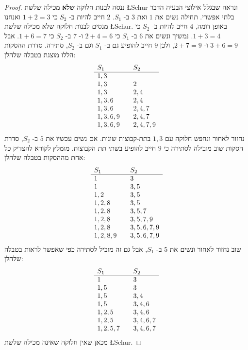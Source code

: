 \begin{proof}
ננסה לבנות חלוקה 
\textbf{שלא}
מכילה שלשת
\L{Schur}
ונראה שבגלל אילוצי הבעיה הדבר בלתי אפשרי. תחילה נשים את
$1$
ואת
$3$
ב-%
$S_1$.
$2$
חייב להיות ב-%
$S_2$
כי
$1+2=3$
ואנחנו מנסים לבנות חלוקה שלא מכילה שלשת
\L{Schur}.
באופן דומה, 
$4$
חייב להיות ב-%
$S_2$
כי
$1+3=4$.
נמשיך ונשים את
$6$
ב-%
$S_1$
כי
$2+4=6$
ו-%
$7$
ב-%
$S_2$
כי
$1+6=7$.
אבל
$3+6=9$
ו-%
$2+7=9$,
ולכן
$9$
חייב להופיע גם ב-%
$S_1$
וגם ב-%
$S_2$, 
סתירה. סדרת ההסקות הללו מוצגת בטבלה שלהלן:
\[
\begin{array}{l@{\hspace{2em}}l}
S_1&S_2\\\hline
1,3 & \\
1,3 & 2\\
1,3 & 2,4\\
1,3,6 & 2,4\\
1,3,6 & 2,4,7\\
1,3,6,9 & 2,4,7\\
1,3,6,9 & 2,4,7,9
\end{array}
\]
נחזור לאחור ונחפש חלוקה עם 
$1,3$
בתת-קבוצות שונות. אם נשים עכשיו את 
$5$
ב-%
$S_2$, 
סדרת הסקות שוב מובילה לסתירה כי 
$9$
חייב להופיע בשתי תת-הקבוצות. מומלץ לקורא להצדיק כל אחת מההסקות בטבלה שלהלן:
\[
\begin{array}{l@{\hspace{2em}}l}
S_1&S_2\\\hline
1&3\\
1 & 3,5\\
1,2&3,5\\
1,2,8&3,5\\
1,2,8&3,5,7\\
1,2,8&3,5,7,9\\
1,2,8&3,5,6,7,9\\
1,2,8,9&3,5,6,7,9
\end{array}
\]
שוב נחזור לאחור ונשים את 
$5$
ב-%
$S_1$,
אבל גם זה מוביל לסתירה כפי שאפשר לראות בטבלה שלהלן:
\[
\begin{array}{l@{\hspace{2em}}l}
S_1&S_2\\\hline
1&3\\
1,5& 3\\
1,5&3,4\\
1,5&3,4,6\\
1,2,5&3,4,6\\
1,2,5&3,4,6,7\\
1,2,5,7&3,4,6,7
\end{array}
\]
מכאן שאין חלוקה שאינה מכילה שלשת
\L{Schur}.
\end{proof}

